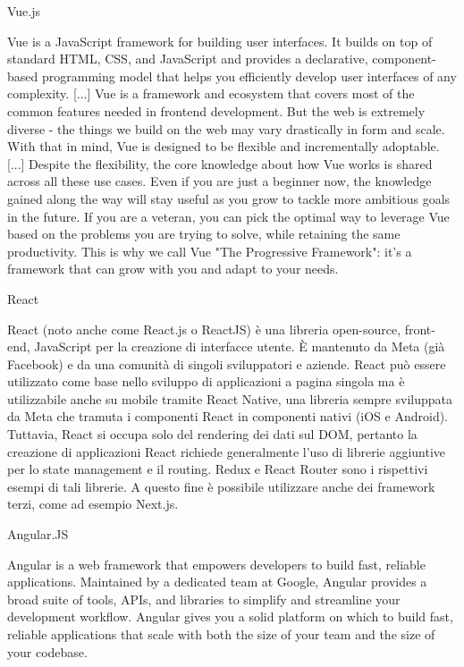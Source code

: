 \documentclass[a4paper,11pt]{article}
\begin{document}
Vue.js

Vue is a JavaScript framework for building user interfaces. It builds on top of standard HTML, CSS, and JavaScript and provides a declarative, component-based programming model that helps you efficiently develop user interfaces of any complexity. [...] Vue is a framework and ecosystem that covers most of the common features needed in frontend development. But the web is extremely diverse - the things we build on the web may vary drastically in form and scale. With that in mind, Vue is designed to be flexible and incrementally adoptable. [...] Despite the flexibility, the core knowledge about how Vue works is shared across all these use cases. Even if you are just a beginner now, the knowledge gained along the way will stay useful as you grow to tackle more ambitious goals in the future. If you are a veteran, you can pick the optimal way to leverage Vue based on the problems you are trying to solve, while retaining the same productivity. This is why we call Vue "The Progressive Framework": it's a framework that can grow with you and adapt to your needs. \cite{vuejsVuejs}

React

React (noto anche come React.js o ReactJS) è una libreria open-source, front-end, JavaScript per la creazione di interfacce utente. È mantenuto da Meta (già Facebook) e da una comunità di singoli sviluppatori e aziende.
React può essere utilizzato come base nello sviluppo di applicazioni a pagina singola ma è utilizzabile anche su mobile tramite React Native, una libreria sempre sviluppata da Meta che tramuta i componenti React in componenti nativi (iOS e Android). Tuttavia, React si occupa solo del rendering dei dati sul DOM, pertanto la creazione di applicazioni React richiede generalmente l'uso di librerie aggiuntive per lo state management e il routing. Redux e React Router sono i rispettivi esempi di tali librerie. A questo fine è possibile utilizzare anche dei framework terzi, come ad esempio Next.js. \cite{wikipediaReactweb}

Angular.JS

Angular is a web framework that empowers developers to build fast, reliable applications. Maintained by a dedicated team at Google, Angular provides a broad suite of tools, APIs, and libraries to simplify and streamline your development workflow. Angular gives you a solid platform on which to build fast, reliable applications that scale with both the size of your team and the size of your codebase. \cite{angularAngular}
\end{document}
